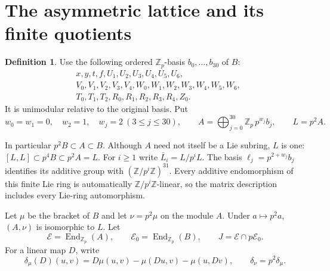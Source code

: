 \documentclass[11pt]{article}
\theoremstyle{definition}\newtheorem{definition}[theorem]{Definition}
\theoremstyle{remark}\newtheorem{remark}[theorem]{Remark}
\DeclareMathOperator{\End}{End}
\newcommand{\Zp}{\mathbb Z_p}
\newcommand{\EE}{\mathcal E}
\begin{document}
\section{The asymmetric lattice and its finite quotients}
\begin{definition}\label{def:A}
Use the following ordered $\Zp$-basis $b_0,\ldots,b_{30}$ of $B$:
\begin{align*}
&x,y,t,f,U_1,U_2,U_3,U_4,U_5,U_6,\\
&V_0,V_1,V_2,V_3,V_4,W_0,W_1,W_2,W_3,W_4,W_5,W_6,\\
&T_0,T_1,T_2,R_0,R_1,R_2,R_3,R_4,Z_0.
\end{align*}
It is unimodular relative to the original basis. Put
\[
 w_0=w_1=0,\quad w_2=1,\quad w_j=2\ (3\le j\le30),
 \qquad A=\bigoplus_{j=0}^{30}\Zp\,p^{w_j}b_j,
 \qquad L=p^2 A.
\]
\end{definition}
In particular $p^2B\subset A\subset B$. Although $A$ need not itself be a
Lie subring, $L$ is one: $[L,L]\subset p^4B\subset p^2A=L$.
For $i\ge1$ write $\bar L_i=L/p^iL$.
The basis $\ell_j=p^{2+w_j}b_j$ identifies its additive group with
$(\mathbb Z/p^i\mathbb Z)^{31}$. Every additive endomorphism of this
finite Lie ring is automatically $\mathbb Z/p^i\mathbb Z$-linear,
so the matrix description includes every Lie-ring automorphism.

Let $\mu$ be the bracket of $B$ and let $\nu=p^2\mu$ on the module $A$.
Under $a\mapsto p^2a$, $(A,\nu)$ is isomorphic to $L$.
Let
\[
 \EE=\End_{\Zp}(A),\qquad \EE_0=\End_{\Zp}(B),\qquad
 J=\EE\cap p\EE_0.
\]
For a linear map $D$, write
\[
 \delta_\mu(D)(u,v)=D\mu(u,v)-\mu(Du,v)-\mu(u,Dv),
 \qquad\delta_\nu=p^2\delta_\mu.
\]
\end{document}
